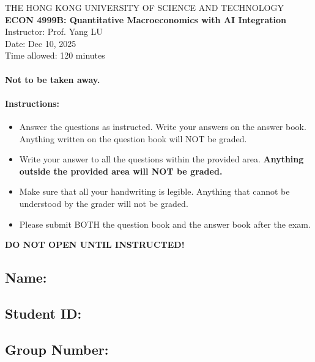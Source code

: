 \documentclass[12pt]{article}
\begin{document}
\thispagestyle{empty}

\begin{center}
    THE HONG KONG UNIVERSITY OF SCIENCE AND TECHNOLOGY\\
    {\large \textbf{ECON 4999B: Quantitative Macroeconomics with AI Integration}}\\
    Instructor: Prof. Yang LU\\
    Date: Dec 10, 2025\\
    Time allowed: 120 minutes
\end{center}

\vspace{12pt}
\paragraph{Not to be taken away.}
\paragraph{Instructions:}
\begin{itemize}
    \item Answer the questions as instructed. Write your answers on the answer book. Anything written on the question book will NOT be graded.
    \item Write your answer to all the questions within the provided area. \textbf{Anything outside the provided area will NOT be graded.} 
    \item Make sure that all your handwriting is legible. Anything that cannot be understood by the grader will not be graded.
    \item Please submit BOTH the question book and the answer book after the exam.
\end{itemize}

\vspace{36pt}
\begin{center}
    \Large
    \textbf{DO NOT OPEN UNTIL INSTRUCTED!}
\end{center}

\vspace{24pt}
\subsection*{Name:}
\subsection*{Student ID: }
\subsection*{Group Number: }
\end{document}
